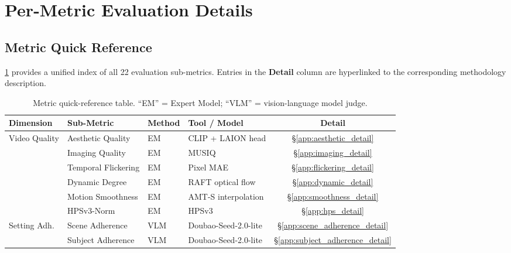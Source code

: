 \documentclass{llmxive}
\providecommand{\numsubmetric}{{22}\xspace}
\providecommand{\arraystretch}{1.05}
\begin{document}
\section{Per-Metric Evaluation Details}
\label{app:metric_details}

\subsection{Metric Quick Reference}
\label{app:metric_quickref}

\cref{tab:metric_quickref} provides a unified index of all \numsubmetric evaluation sub-metrics. Entries in the \textbf{Detail} column are hyperlinked to the corresponding methodology description.

\begin{table}[!htbp]
\caption[Metric quick-reference]{Metric quick-reference table. ``EM'' = Expert Model; ``VLM'' = vision-language model judge.}
\vspace{+1mm}
\label{tab:metric_quickref}
\centering
\renewcommand{\arraystretch}{1.15}
\scriptsize
\setlength{\tabcolsep}{3pt}
\begin{tabular}{@{}l l l l c@{}}
\toprule
\textbf{Dimension} & \textbf{Sub-Metric} & \textbf{Method} & \textbf{Tool / Model} & \textbf{Detail} \\
\midrule
\multirow{6}{*}{Video Quality}
  & Aesthetic Quality    & EM  & CLIP + LAION head     & \hyperref[app:aesthetic_detail]{\S\ref*{app:aesthetic_detail}} \\
  & Imaging Quality      & EM  & MUSIQ                 & \hyperref[app:imaging_detail]{\S\ref*{app:imaging_detail}} \\
  & Temporal Flickering  & EM  & Pixel MAE             & \hyperref[app:flickering_detail]{\S\ref*{app:flickering_detail}} \\
  & Dynamic Degree       & EM  & RAFT optical flow     & \hyperref[app:dynamic_detail]{\S\ref*{app:dynamic_detail}} \\
  & Motion Smoothness    & EM  & AMT-S interpolation   & \hyperref[app:smoothness_detail]{\S\ref*{app:smoothness_detail}} \\
  & HPSv3-Norm           & EM  & HPSv3                 & \hyperref[app:hps_detail]{\S\ref*{app:hps_detail}} \\
\midrule
\multirow{2}{*}{Setting Adh.}
  & Scene Adherence      & VLM & Doubao-Seed-2.0-lite  & \hyperref[app:scene_adherence_detail]{\S\ref*{app:scene_adherence_detail}} \\
  & Subject Adherence    & VLM & Doubao-Seed-2.0-lite  & \hyperref[app:subject_adherence_detail]{\S\ref*{app:subject_adherence_detail}} \\

\end{tabular}
\end{table}
\end{document}
